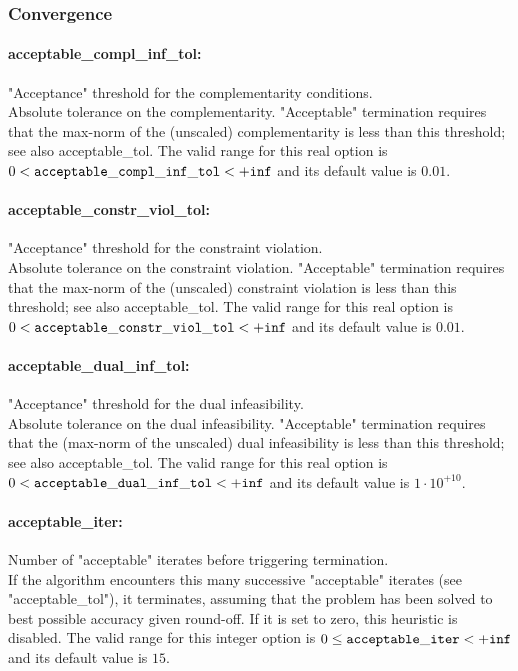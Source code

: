 \subsubsection{Convergence}
\label{sec:Convergence}

\paragraph{acceptable\_compl\_inf\_tol:}\label{sec:acceptable_compl_inf_tol} "Acceptance" threshold for the complementarity conditions. $\;$ \\
 Absolute tolerance on the complementarity.
"Acceptable" termination requires that the
max-norm of the (unscaled) complementarity is
less than this threshold; see also
acceptable\_tol. The valid range for this real option is 
$0 <  {\tt acceptable\_compl\_inf\_tol } <  {\tt +inf}$
and its default value is $0.01$.


\paragraph{acceptable\_constr\_viol\_tol:}\label{sec:acceptable_constr_viol_tol} "Acceptance" threshold for the constraint violation. $\;$ \\
 Absolute tolerance on the constraint violation.
"Acceptable" termination requires that the
max-norm of the (unscaled) constraint violation
is less than this threshold; see also
acceptable\_tol. The valid range for this real option is 
$0 <  {\tt acceptable\_constr\_viol\_tol } <  {\tt +inf}$
and its default value is $0.01$.


\paragraph{acceptable\_dual\_inf\_tol:}\label{sec:acceptable_dual_inf_tol} "Acceptance" threshold for the dual infeasibility. $\;$ \\
 Absolute tolerance on the dual infeasibility.
"Acceptable" termination requires that the
(max-norm of the unscaled) dual infeasibility is
less than this threshold; see also
acceptable\_tol. The valid range for this real option is 
$0 <  {\tt acceptable\_dual\_inf\_tol } <  {\tt +inf}$
and its default value is $1 \cdot 10^{+10}$.


\paragraph{acceptable\_iter:}\label{sec:acceptable_iter} Number of "acceptable" iterates before triggering termination. $\;$ \\
 If the algorithm encounters this many successive
"acceptable" iterates (see "acceptable\_tol"), it
terminates, assuming that the problem has been
solved to best possible accuracy given round-off.
 If it is set to zero, this heuristic is disabled. The valid range for this integer option is
$0 \le {\tt acceptable\_iter } <  {\tt +inf}$
and its default value is $15$.


